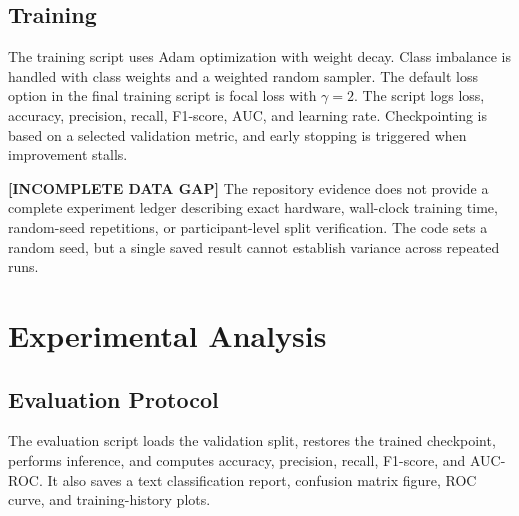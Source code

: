 \documentclass[conference]{IEEEtran}
\newcommand{\gap}{\textbf{[INCOMPLETE DATA GAP]}}
\begin{document}
\subsection{Training}
The training script uses Adam optimization with weight decay. Class imbalance is handled with class weights and a weighted random sampler. The default loss option in the final training script is focal loss with \(\gamma=2\). The script logs loss, accuracy, precision, recall, F1-score, AUC, and learning rate. Checkpointing is based on a selected validation metric, and early stopping is triggered when improvement stalls.

\gap{} The repository evidence does not provide a complete experiment ledger describing exact hardware, wall-clock training time, random-seed repetitions, or participant-level split verification. The code sets a random seed, but a single saved result cannot establish variance across repeated runs.

\section{Experimental Analysis}
\subsection{Evaluation Protocol}
The evaluation script loads the validation split, restores the trained checkpoint, performs inference, and computes accuracy, precision, recall, F1-score, and AUC-ROC. It also saves a text classification report, confusion matrix figure, ROC curve, and training-history plots.
\end{document}
